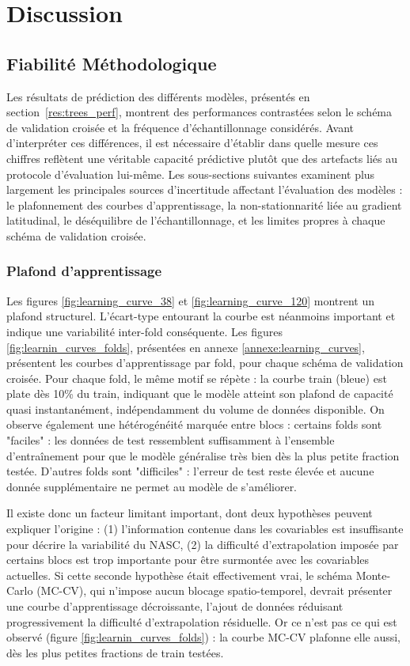 \documentclass[11pt,a4paper,oneside]{report}
\begin{document}
	\clearpage
	\chapter{Discussion}
	\section{Fiabilité Méthodologique}
	\label{discussion:fiabilite}
	Les résultats de prédiction des différents modèles, présentés en section~\ref{res:trees_perf}, montrent des performances contrastées selon le schéma de validation croisée et la fréquence d'échantillonnage considérés. Avant d'interpréter ces différences, il est nécessaire d'établir dans quelle mesure ces chiffres reflètent une véritable capacité prédictive plutôt que des artefacts liés au protocole d'évaluation lui-même. Les sous-sections suivantes examinent plus largement les principales sources d'incertitude affectant l'évaluation des modèles : le plafonnement des courbes d'apprentissage, la non-stationnarité liée au gradient latitudinal, le déséquilibre de l'échantillonnage, et les limites propres à chaque schéma de validation croisée.
	
	\subsection{Plafond d'apprentissage}
	\label{discussion:plafond}
	Les figures \ref{fig:learning_curve_38} et \ref{fig:learning_curve_120} montrent un plafond structurel. L'écart-type entourant la courbe est néanmoins important et indique une variabilité inter-fold conséquente. Les figures \ref{fig:learnin_curves_folds}, présentées en annexe \ref{annexe:learning_curves}, présentent les courbes d'apprentissage par fold, pour chaque schéma de validation croisée. Pour chaque fold, le même motif se répète : la courbe train (bleue) est plate dès 10\% du train, indiquant que le modèle atteint son plafond de capacité quasi instantanément, indépendamment du volume de données disponible. On observe également une hétérogénéité marquée entre blocs : certains folds sont "faciles" : les données de test ressemblent suffisamment à l'ensemble d'entraînement pour que le modèle généralise très bien dès la plus petite fraction testée. D'autres folds sont "difficiles" : l'erreur de test reste élevée et aucune donnée supplémentaire ne permet au modèle de s'améliorer.
	
	Il existe donc un facteur limitant important, dont deux hypothèses peuvent expliquer l'origine : (1) l'information contenue dans les covariables est insuffisante pour décrire la variabilité du NASC, (2) la difficulté d'extrapolation imposée par certains blocs est trop importante pour être surmontée avec les covariables actuelles. Si cette seconde hypothèse était effectivement vrai, le schéma Monte-Carlo (MC-CV), qui n'impose aucun blocage spatio-temporel, devrait présenter une courbe d'apprentissage décroissante, l'ajout de données réduisant progressivement la difficulté d'extrapolation résiduelle. Or ce n'est pas ce qui est observé (figure \ref{fig:learnin_curves_folds}) : la courbe MC-CV plafonne elle aussi, dès les plus petites fractions de train testées.
	
\end{document}
